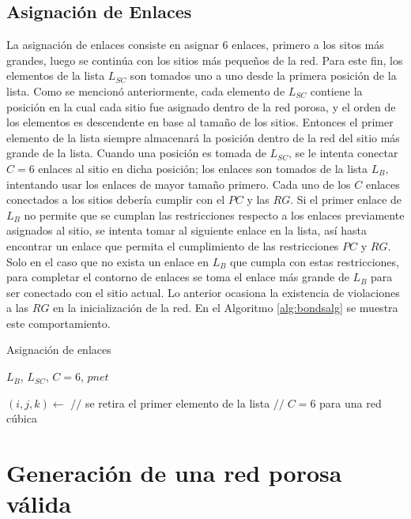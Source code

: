 \subsection{Asignación de Enlaces}
\label{subsec:sbonds}
La asignación de enlaces consiste en asignar 6 enlaces, primero a los sitos más grandes, luego se contin\'ua con los sitios más pequeños de 
la red. Para este fin, los elementos de la lista $L_{SC}$ son tomados uno a uno desde la primera posición de la lista. Como se mencion\'o 
anteriormente, cada elemento de $L_{SC}$ contiene la posición en la cual cada sitio fue asignado dentro de la red porosa, y el orden de 
los elementos es descendente en base al tamaño de los sitios. Entonces el primer elemento de la lista siempre almacenar\'a la posición 
dentro de la red del sitio más grande de la lista. Cuando una posici\'on es tomada de $L_{SC}$, se le intenta conectar $C=6$ enlaces 
al sitio en dicha posición; los enlaces son tomados de la lista $L_B$, intentando usar los enlaces de mayor tamaño primero. Cada uno 
de los $C$ enlaces conectados a los sitios debería cumplir con el $PC$ y las $RG$. Si el primer enlace de $L_B$ no permite que se cumplan
las restricciones respecto a los enlaces previamente asignados al sitio, se intenta tomar al siguiente enlace en la lista, así hasta encontrar
un enlace que permita el cumplimiento de las restricciones $PC$ y $RG$. Solo en el caso que no exista un enlace en $L_B$ que 
cumpla con estas restricciones, para completar el contorno de enlaces se toma el enlace más grande de $L_B$ para ser conectado con 
el sitio actual. Lo anterior ocasiona la existencia de violaciones a las $RG$ en la inicialización de la red. En el Algoritmo \ref{alg:bondsalg} se muestra 
este comportamiento.\\

\begin{algorithm}
\caption{Asignación de enlaces}\label{alg:bondsalg}
\begin{algorithmic}[1]
\Require $L_B$, $L_{SC}$, $C=6$, $pnet$

	\State $(i,j,k)\gets $ {$//$ se retira el primer elemento de la lista}
	 {$//\;C=6$ para una red cúbica}
		\State {}
	\EndFor
\EndWhile
\end{algorithmic}
\end{algorithm}

\section{Generación de una red porosa válida}
\label{sec:svalid}


